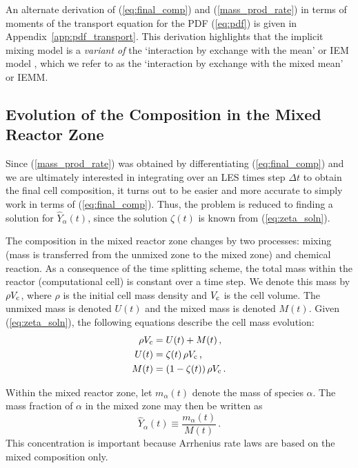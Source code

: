 An alternate derivation of (\ref{eq:final_comp}) and (\ref{mass_prod_rate}) in terms of moments of the transport equation for the PDF (\ref{eq:pdf}) is given in Appendix~\ref{app:pdf_transport}.  This derivation highlights that the implicit mixing model is a \emph{variant of} the `interaction by exchange with the mean' or IEM model \cite{Dopazo:1974}, which we refer to as the `interaction by exchange with the mixed mean' or IEMM.

\subsection{Evolution of the Composition in the Mixed Reactor Zone}

Since (\ref{mass_prod_rate}) was obtained by differentiating (\ref{eq:final_comp}) and we are ultimately interested in integrating over an LES times step $\Delta t$ to obtain the final cell composition, it turns out to be easier and more accurate to simply work in terms of (\ref{eq:final_comp}). Thus, the problem is reduced to finding a solution for $\hat{Y}_{\alpha}(t)$, since the solution $\zeta(t)$ is known from (\ref{eq:zeta_soln}).

The composition in the mixed reactor zone changes by two processes: mixing (mass is transferred from the unmixed zone to the mixed zone) and chemical reaction. As a consequence of the time splitting scheme, the total mass within the reactor (computational cell) is constant over a time step.  We denote this mass by $\rho V_{\rm c}$, where $\rho$ is the initial cell mass density and $V_{\rm c}$ is the cell volume.  The unmixed mass is denoted $U(t)$ and the mixed mass is denoted $M(t)$.  Given (\ref{eq:zeta_soln}), the following equations describe the cell mass evolution:
\begin{align}
\label{eq:mixunmix_1} \rho V_{\rm c} &= U(t) + M(t) \,\mbox{,}\\
\label{eq:mixunmix_2} U(t) &= \zeta(t)\,\rho V_{\rm c} \,\mbox{,}\\
\label{eq:mixunmix_3} M(t) &= (1-\zeta(t))\,\rho V_{\rm c} \,\mbox{.}
\end{align}

Within the mixed reactor zone, let $m_\alpha(t)$ denote the mass of species $\alpha$.  The mass fraction of $\alpha$ in the mixed zone may then be written as
\begin{equation}
\label{eq:mass_fraction_mixed}
\hat{Y}_{\alpha}(t)\equiv\frac{m_{\alpha}(t)}{M(t)} \,\mbox{.}
\end{equation}
This concentration is important because Arrhenius rate laws are based on the mixed composition only.

